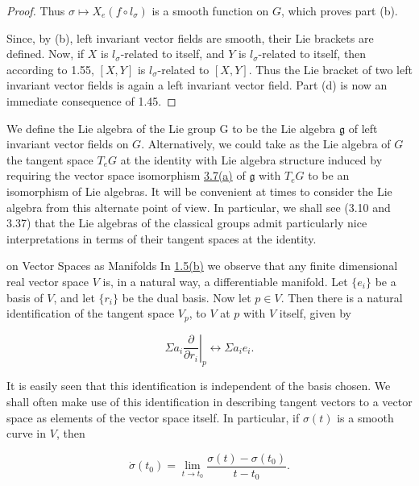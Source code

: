 \begin{proof}
Thus $\sigma \mapsto X_{e}(f \circ l_{\sigma})$ is a smooth function on $G$, which proves part (b).

Since, by (b), left invariant vector fields are smooth, their Lie brackets are defined. Now, if $X$ is $l_{\sigma}$-related to itself, and $Y$ is $l_{\sigma}$-related to itself, then according to 1.55, $[X,Y]$ is $l_{\sigma}$-related to $[X,Y]$. Thus the Lie bracket of two left invariant vector fields is again a left invariant vector field. Part (d) is now an immediate consequence of 1.45.

\end{proof}

\begin{definition}\label{thm:3.8}
We define the Lie algebra of the Lie group G to be the Lie algebra $\mathfrak{g}$ of left invariant vector fields on $G$. Alternatively, we could take as the Lie algebra of $G$ the tangent space $T_{e} G$ at the identity with Lie algebra structure induced by requiring the vector space isomorphism \hyperref[thm:3.7]{3.7(a)} of $\mathfrak{g}$ with $T_{e} G$ to be an isomorphism of Lie algebras. It will be convenient at times to consider the Lie algebra from this alternate point of view. In particular, we shall see (3.10 and 3.37) that the Lie algebras of the classical groups admit particularly nice interpretations in terms of their tangent spaces at the identity.

\end{definition}

\begin{remarks}{on Vector Spaces as Manifolds}\label{thm:3.9}
In \hyperref[thm:1.5]{1.5(b)} we observe that any finite dimensional real vector space $V$ is, in a natural way, a differentiable manifold. Let $\{e_i\}$ be a basis of $V$, and let $\{r_i\}$ be the dual basis. Now let $p \in V$. Then there is a natural identification of the tangent space $V_p$, to $V$ at $p$ with $V$ itself, given by

\begin{equation}
\tag{1}\label{eq:3.9:1}
\left.\Sigma a_{i}\frac{\partial}{\partial r_{i}}\right\vert_{p}\leftrightarrow\left.\Sigma a_{i}e_{i}.\right.
\end{equation}

It is easily seen that this identification is independent of the basis chosen. We shall often make use of this identification in describing tangent vectors to a vector space as elements of the vector space itself. In particular, if $\sigma(t)$ is a smooth curve in $V$, then

\begin{equation}
\tag{2}\label{eq:3.9:2}
\dot{\sigma}(t_{0})=\lim_{t\to t_{0}}\frac{\sigma(t)-\sigma(t_{0})}{t-t_{0}}.
\end{equation}

\end{remarks}

